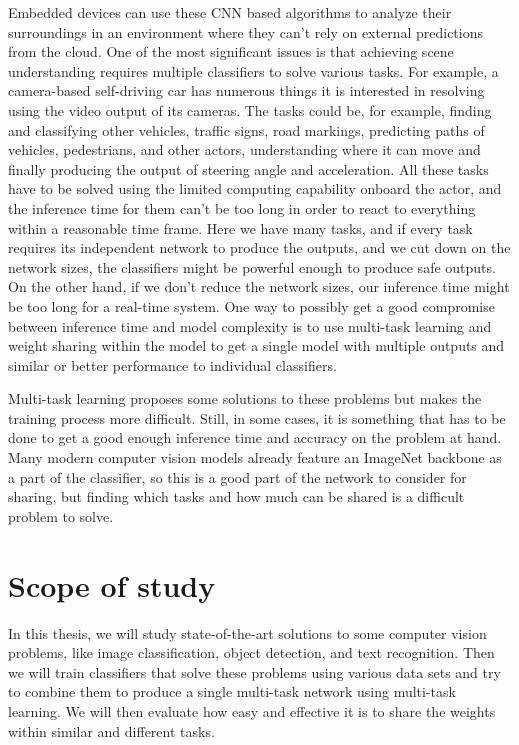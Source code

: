 Embedded devices can use these CNN based algorithms to analyze their surroundings in an environment where they can't rely on external predictions from the cloud. One of the most significant issues is that achieving scene understanding requires multiple classifiers to solve various tasks. For example, a camera-based self-driving car has numerous things it is interested in resolving using the video output of its cameras. The tasks could be, for example, finding and classifying other vehicles, traffic signs, road markings, predicting paths of vehicles, pedestrians, and other actors, understanding where it can move and finally producing the output of steering angle and acceleration. All these tasks have to be solved using the limited computing capability onboard the actor, and the inference time for them can't be too long in order to react to everything within a reasonable time frame. Here we have many tasks, and if every task requires its independent network to produce the outputs, and we cut down on the network sizes, the classifiers might be powerful enough to produce safe outputs. On the other hand, if we don't reduce the network sizes, our inference time might be too long for a real-time system. One way to possibly get a good compromise between inference time and model complexity is to use multi-task learning and weight sharing within the model to get a single model with multiple outputs and similar or better performance to individual classifiers.

Multi-task learning proposes some solutions to these problems but makes the training process more difficult. Still, in some cases, it is something that has to be done to get a good enough inference time and accuracy on the problem at hand. Many modern computer vision models already feature an ImageNet backbone as a part of the classifier, so this is a good part of the network to consider for sharing, but finding which tasks and how much can be shared is a difficult problem to solve.

\section{Scope of study}
In this thesis, we will study state-of-the-art solutions to some computer vision problems, like image classification, object detection, and text recognition. Then we will train classifiers that solve these problems using various data sets and try to combine them to produce a single multi-task network using multi-task learning. We will then evaluate how easy and effective it is to share the weights within similar and different tasks.